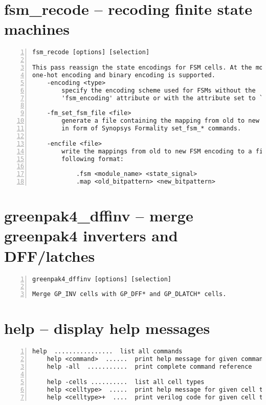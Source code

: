 \section{fsm\_recode -- recoding finite state machines}
\label{cmd:fsm_recode}
\begin{lstlisting}[numbers=left,frame=single]
    fsm_recode [options] [selection]

This pass reassign the state encodings for FSM cells. At the moment only
one-hot encoding and binary encoding is supported.
    -encoding <type>
        specify the encoding scheme used for FSMs without the
        'fsm_encoding' attribute or with the attribute set to `auto'.

    -fm_set_fsm_file <file>
        generate a file containing the mapping from old to new FSM encoding
        in form of Synopsys Formality set_fsm_* commands.

    -encfile <file>
        write the mappings from old to new FSM encoding to a file in the
        following format:

            .fsm <module_name> <state_signal>
            .map <old_bitpattern> <new_bitpattern>
\end{lstlisting}

\section{greenpak4\_dffinv -- merge greenpak4 inverters and DFF/latches}
\label{cmd:greenpak4_dffinv}
\begin{lstlisting}[numbers=left,frame=single]
    greenpak4_dffinv [options] [selection]

Merge GP_INV cells with GP_DFF* and GP_DLATCH* cells.
\end{lstlisting}

\section{help -- display help messages}
\label{cmd:help}
\begin{lstlisting}[numbers=left,frame=single]
    help  ................  list all commands
    help <command>  ......  print help message for given command
    help -all  ...........  print complete command reference

    help -cells ..........  list all cell types
    help <celltype>  .....  print help message for given cell type
    help <celltype>+  ....  print verilog code for given cell type
\end{lstlisting}

